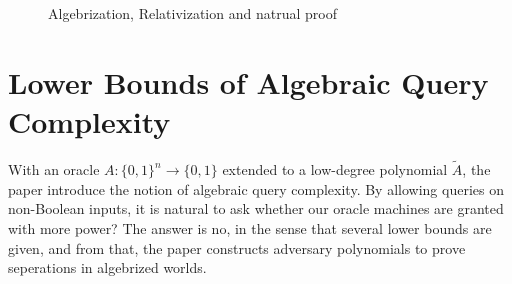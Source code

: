 \documentclass{article}
\begin{document}
\begin{figure}[!htb]
        \caption{\label{fig:my-label} Algebrization, Relativization and natrual proof}
\end{figure}



\section{Lower Bounds of Algebraic Query Complexity}

  With an oracle $A:\{0,1\}^n\rightarrow\{0,1\}$ extended to a low-degree polynomial $\tilde{A}$, the paper introduce the notion of algebraic query complexity. By allowing queries on non-Boolean inputs, it is natural to ask whether our oracle machines are granted with more power? The answer is no, in the sense that several lower bounds are given, and from that, the paper constructs adversary polynomials to prove seperations in algebrized worlds.
\end{document}
